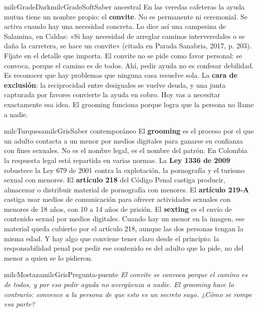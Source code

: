 \documentclass[11pt,letterpaper]{article}
\begin{document}
\begin{softbox}{milcGradeDark}{milcGradeSoft}{Saber ancestral}
En las veredas cafeteras la ayuda mutua tiene un nombre propio: el \textbf{convite}. No es permanente ni ceremonial. Se activa cuando hay una necesidad concreta. Lo dice así una campesina de Salamina, en Caldas: «Si hay necesidad de arreglar caminos interveredales o se daña la carretera, se hace un convite» (citada en Parada Sanabria, 2017, p. 203). Fíjate en el detalle que importa. El convite no se pide como favor personal: se convoca, porque el camino es de todos. Ahí, pedir ayuda no es confesar debilidad. Es reconocer que hay problemas que ninguna casa resuelve sola. La \textbf{cara de exclusión}: la reciprocidad entre desiguales se vuelve deuda, y una junta capturada por favores convierte la ayuda en cobro. Hoy vas a necesitar exactamente esa idea. El grooming funciona porque logra que la persona no llame a nadie.\par{}
\end{softbox}

\begin{softbox}{milcTurquesa}{milcGris}{Saber contemporáneo}
El \textbf{grooming} es el proceso por el que un adulto contacta a un menor por medios digitales para ganarse su confianza con fines sexuales. No es el nombre legal, es el nombre del patrón. En Colombia la respuesta legal está repartida en varias normas. La \textbf{Ley 1336 de 2009} robustece la Ley 679 de 2001 contra la explotación, la pornografía y el turismo sexual con menores. El \textbf{artículo 218} del Código Penal castiga producir, almacenar o distribuir material de pornografía con menores. El \textbf{artículo 219-A} castiga usar medios de comunicación para ofrecer actividades sexuales con menores de 18 años, con 10 a 14 años de prisión. El \textbf{sexting} es el envío de contenido sexual por medios digitales. Cuando hay un menor en la imagen, ese material queda cubierto por el artículo 218, aunque las dos personas tengan la misma edad. Y hay algo que conviene tener claro desde el principio: la responsabilidad penal por pedir ese contenido es del adulto que lo pide, no del menor a quien se lo pidieron.
\end{softbox}

\begin{softbox}{milcMostaza}{milcGris}{Pregunta-puente}
\textit{El convite se convoca porque el camino es de todos, y por eso pedir ayuda no avergüenza a nadie. El grooming hace lo contrario: convence a la persona de que esto es un secreto suyo. ¿Cómo se rompe esa parte?}
\end{softbox}
\end{document}
